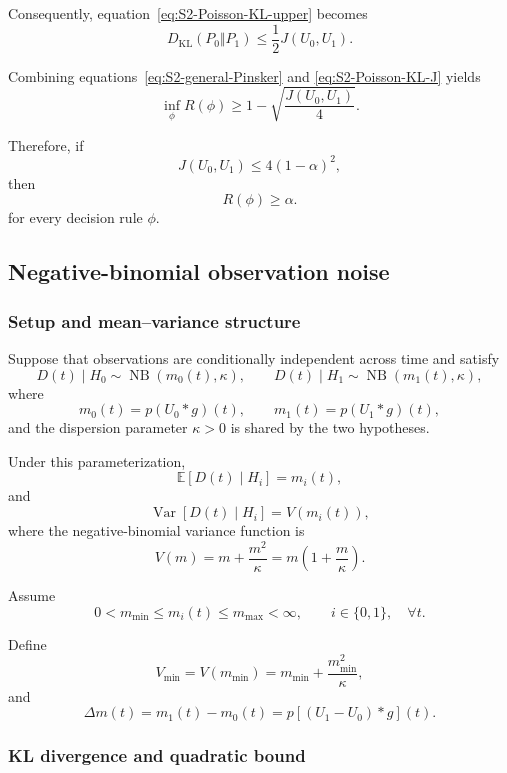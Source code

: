 Consequently, equation~\eqref{eq:S2-Poisson-KL-upper} becomes
\begin{equation}
\label{eq:S2-Poisson-KL-J}
D_{\mathrm{KL}}(P_0\Vert P_1)
\le
\frac{1}{2}J(U_0,U_1).
\end{equation}

Combining equations~\eqref{eq:S2-general-Pinsker} and
\eqref{eq:S2-Poisson-KL-J} yields
\[
\inf_{\phi}R(\phi)
\ge
1-
\sqrt{
\frac{J(U_0,U_1)}{4}
}.
\]

Therefore, if
\begin{equation}
\label{eq:S2-Poisson-threshold}
J(U_0,U_1)
\le
4(1-\alpha)^2,
\end{equation}
then
\[
R(\phi)\ge\alpha.
\]
for every decision rule $\phi$.


\subsection{Negative-binomial observation noise}

\subsubsection{Setup and mean--variance structure}

Suppose that observations are conditionally independent across time
and satisfy
\[
D(t)\mid H_0
\sim
\operatorname{NB}\!\left(m_0(t),\kappa\right),
\qquad
D(t)\mid H_1
\sim
\operatorname{NB}\!\left(m_1(t),\kappa\right),
\]
where
\[
m_0(t)=p(U_0*g)(t),
\qquad
m_1(t)=p(U_1*g)(t),
\]
and the dispersion parameter \(\kappa>0\) is shared by the two
hypotheses.

Under this parameterization,
\[
\mathbb E[D(t)\mid H_i]
=
m_i(t),
\]
and
\[
\operatorname{Var}[D(t)\mid H_i]
=
V\!\left(m_i(t)\right),
\]
where the negative-binomial variance function is
\begin{equation}
\label{eq:S2-NB-variance-function}
V(m)
=
m+\frac{m^2}{\kappa}
=
m\left(1+\frac{m}{\kappa}\right).
\end{equation}

Assume
\[
0<m_{\min}
\le
m_i(t)
\le
m_{\max}
<\infty,
\qquad
i\in\{0,1\},
\quad
\forall t.
\]

Define
\[
V_{\min}
=
V(m_{\min})
=
m_{\min}
+
\frac{m_{\min}^2}{\kappa},
\]
and
\[
\Delta m(t)
=
m_1(t)-m_0(t)
=
p[(U_1-U_0)*g](t).
\]

\subsubsection{KL divergence and quadratic bound}

